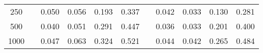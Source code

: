 % 
\begin{tabular}{ccccccccccc}
  \hline
  \hline
250 &  & 0.050 & 0.056 & 0.193 & 0.337 &  & 0.042 & 0.033 & 0.130 & 0.281 \\ 
  500 &  & 0.040 & 0.051 & 0.291 & 0.447 &  & 0.036 & 0.033 & 0.201 & 0.400 \\ 
  1000 &  & 0.047 & 0.063 & 0.324 & 0.521 &  & 0.044 & 0.042 & 0.265 & 0.484 \\ 
   \hline
\end{tabular}
